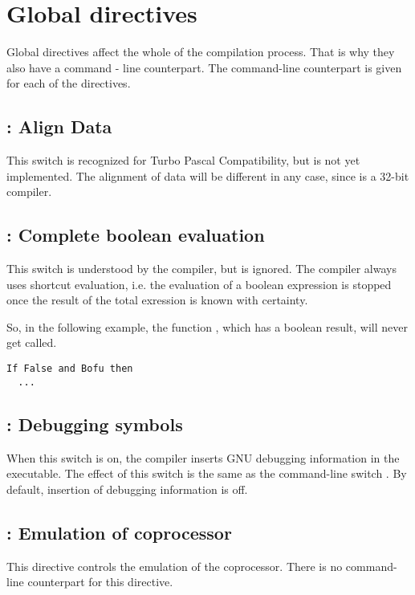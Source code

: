\documentclass{report}
\begin{document}
\section{Global directives}
\label{se:GlobalSwitch}
Global directives affect the whole of the compilation process. That is why
they also have a command - line counterpart. The command-line counterpart is
given for each of the directives.

\subsection{ : Align Data}

This switch is recognized for Turbo Pascal Compatibility, but is not
yet implemented. The alignment of data will be different in any case, since
\fpc is a 32-bit compiler.

\subsection{ : Complete boolean evaluation}

This switch is understood by the \fpc compiler, but is ignored. The compiler
always uses shortcut evaluation, i.e. the evaluation of a boolean expression
is stopped once the result of the total exression is known with certainty.

So, in the following example, the function , which has a boolean
result, will never get called.
\begin{verbatim}
If False and Bofu then
  ...
\end{verbatim}

\subsection{ : Debugging symbols}

When this switch is on, the compiler inserts GNU debugging information in
the executable. The effect of this switch is the same as the command-line
switch . By default, insertion of debugging information is off.

\subsection{ : Emulation of coprocessor}

This directive controls the emulation of the coprocessor. There is no
command-line counterpart for this directive.
\end{document}
